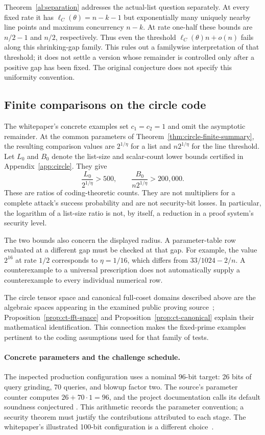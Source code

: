 \documentclass[11pt,letterpaper]{article}
\theoremstyle{definition}
\theoremstyle{remark}
\begin{document}
Theorem~\ref{al:separation} addresses the actual-list question separately.
At every fixed rate it has $\ell_C(\theta)=n-k-1$ but exponentially
many uniquely nearby line points and maximum concurrency $n-k$.
At rate one-half these bounds are $n/2-1$ and $n/2$, respectively. Thus even the threshold
$\ell_C(\theta)n+o(n)$ fails along this shrinking-gap family.
This rules out a familywise interpretation of that threshold; it does
not settle a version whose remainder is controlled only after a
positive gap has been fixed. The original conjecture does not specify
this uniformity convention.

\subsection{Finite comparisons on the circle code}

The whitepaper's concrete examples set $c_1=c_2=1$ and omit the
asymptotic remainder. At the common parameters of
Theorem~\ref{thm:circle-finite-summary}, the resulting comparison
values are $2^{1/\eta}$ for a list and $n2^{1/\eta}$ for the line
threshold. Let $L_0$ and $B_0$ denote the list-size and scalar-count
lower bounds certified in Appendix~\ref{app:circle}. They give
\[
 \frac{L_0}{2^{1/\eta}}>500,
 \qquad
 \frac{B_0}{n2^{1/\eta}}>200{,}000.
\]
These are ratios of coding-theoretic counts. They are not multipliers
for a complete attack's success probability and are not security-bit
losses. In particular, the logarithm of a list-size ratio is not, by
itself, a reduction in a proof system's security level.

The two bounds also concern the displayed radius. A parameter-table
row evaluated at a different gap must be checked at that gap. For
example, the value $2^{16}$ at rate $1/2$ corresponds to $\eta=1/16$,
which differs from $33/1024-2/n$. A counterexample to a universal
prescription does not automatically supply a counterexample to every
individual numerical row.

The circle tensor space and canonical full-coset domains described
above are the algebraic spaces appearing in the examined public
proving source~\cite{proving}; Proposition~\ref{prop:ct-fft-space} and
Proposition~\ref{prop:ct-canonical} explain their mathematical
identification. This connection makes the fixed-prime examples
pertinent to the coding assumptions used for that family of tests.

\paragraph{Concrete parameters and the challenge schedule.}
The inspected production configuration uses a nominal 96-bit target:
26 bits of query grinding, 70 queries, and blowup factor two. The
source's parameter counter computes $26+70\cdot1=96$, and the
project documentation calls its default soundness conjectured
\cite{stwo-config}. This arithmetic records the parameter convention;
a security theorem must justify the contributions attributed to each
stage. The whitepaper's illustrated 100-bit configuration is a different
choice~\cite[Section~5.5]{stwo}.
\end{document}
